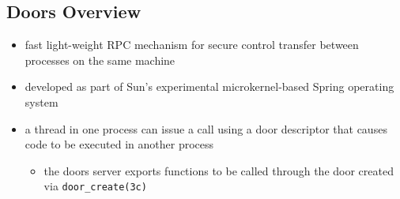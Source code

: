 %
%

\subsection{Doors Overview}

\begin{itemize}
\item fast light-weight RPC mechanism for secure control transfer between
processes on the same machine
\item developed as part of Sun's experimental microkernel-based Spring operating
system
\item a thread in one process can issue a call using a door descriptor that
causes code to be executed in another process
	\begin{itemize}
  	\item the doors server exports functions to be called through the door
	created via \texttt{door\_create(3c)}
	\end{itemize}
\end{itemize}


